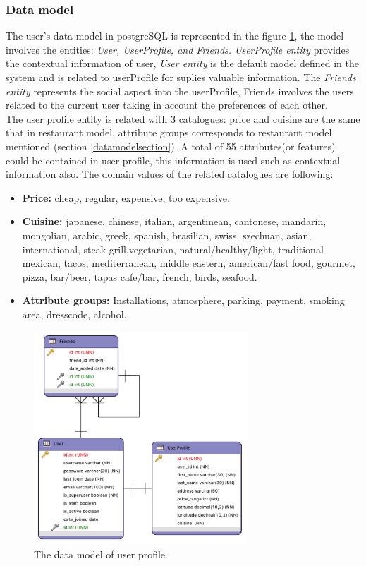 \subsubsection{Data model} 

The user's data model in postgreSQL is represented in the figure
\ref{fig:datausermodel}, the model involves the entities:
\textit{User, UserProfile, and Friends.} \textit{UserProfile entity}
provides the contextual information of user, \textit{User entity} is
the default model defined in the system and is related to userProfile
for suplies valuable information. The \textit{Friends entity}
represents the social aspect into the userProfile, Friends involves
the users related to the current user taking in account the
preferences of each other. \\  The user profile entity is related with
3 catalogues: price and cuisine are the same that in restaurant model,
attribute groups corresponds to restaurant model mentioned (section
\ref{datamodelsection}). A total of 55 attributes(or features) could
be contained in user profile, this information is used such as 
contextual information also. The domain values of the related
catalogues are following:

\begin{itemize}
\item  \textbf{Price:} cheap, regular, expensive, too expensive.
\item  \textbf{Cuisine:} japanese, chinese, italian, argentinean,
cantonese, mandarin, mongolian, arabic, greek, spanish, brasilian,
swiss, szechuan, asian, international, steak grill,vegetarian,
natural/healthy/light, traditional mexican, tacos, mediterranean,
middle eastern, american/fast food, gourmet, pizza, bar/beer, tapas
cafe/bar, french, birds, seafood.
\item  \textbf{Attribute groups:} Installations, atmosphere, 
parking, payment, smoking area, dresscode, alcohol.

\end{itemize}

\begin{figure}
\centering
\includegraphics[width=8cm,height=8cm,keepaspectratio]{img/data-usermodel.png}
\caption{The data model of user profile.}
\label{fig:datausermodel}     
\end{figure}

